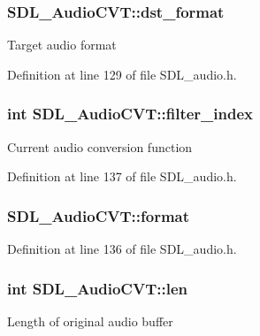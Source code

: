 \subsubsection[{dst\+\_\+format}]{ S\+D\+L\+\_\+\+Audio\+C\+V\+T\+::dst\+\_\+format}\label{struct_s_d_l___audio_c_v_t_a2388a295604af1169651568742de928d}
Target audio format 

Definition at line 129 of file S\+D\+L\+\_\+audio.\+h.

\hypertarget{struct_s_d_l___audio_c_v_t_a35093b3ad3331c17416c593a76012b63}{}
\subsubsection[{filter\+\_\+index}]{\setlength{\rightskip}{0pt plus 5cm}int S\+D\+L\+\_\+\+Audio\+C\+V\+T\+::filter\+\_\+index}\label{struct_s_d_l___audio_c_v_t_a35093b3ad3331c17416c593a76012b63}
Current audio conversion function 

Definition at line 137 of file S\+D\+L\+\_\+audio.\+h.

\hypertarget{struct_s_d_l___audio_c_v_t_a020b6e1c01089169921ddb0c1e7f08d2}{}
\subsubsection[{format}]{ S\+D\+L\+\_\+\+Audio\+C\+V\+T\+::format}\label{struct_s_d_l___audio_c_v_t_a020b6e1c01089169921ddb0c1e7f08d2}


Definition at line 136 of file S\+D\+L\+\_\+audio.\+h.

\hypertarget{struct_s_d_l___audio_c_v_t_aeaeb8c5a63c3ab96471fbfdf412c78ff}{}
\subsubsection[{len}]{\setlength{\rightskip}{0pt plus 5cm}int S\+D\+L\+\_\+\+Audio\+C\+V\+T\+::len}\label{struct_s_d_l___audio_c_v_t_aeaeb8c5a63c3ab96471fbfdf412c78ff}
Length of original audio buffer 

